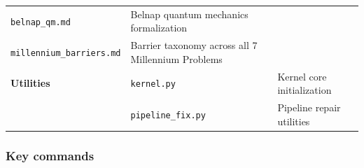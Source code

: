 \begin{longtable}[]{@{}lll@{}}
\begin{minipage}[t]{0.23\columnwidth}
\texttt{belnap\_qm.md}\strut
\end{minipage} & \begin{minipage}[t]{0.26\columnwidth}\raggedright
Belnap quantum mechanics formalization\strut
\end{minipage} & \begin{minipage}[t]{0.42\columnwidth}\raggedright
\strut
\end{minipage}\tabularnewline
\begin{minipage}[t]{0.23\columnwidth}\raggedright
\texttt{millennium\_barriers.md}\strut
\end{minipage} & \begin{minipage}[t]{0.26\columnwidth}\raggedright
Barrier taxonomy across all 7 Millennium Problems\strut
\end{minipage} & \begin{minipage}[t]{0.42\columnwidth}\raggedright
\strut
\end{minipage}\tabularnewline
\begin{minipage}[t]{0.23\columnwidth}\raggedright
\textbf{Utilities}\strut
\end{minipage} & \begin{minipage}[t]{0.26\columnwidth}\raggedright
\texttt{kernel.py}\strut
\end{minipage} & \begin{minipage}[t]{0.42\columnwidth}\raggedright
Kernel core initialization\strut
\end{minipage}\tabularnewline
\begin{minipage}[t]{0.23\columnwidth}\raggedright
\strut
\end{minipage} & \begin{minipage}[t]{0.26\columnwidth}\raggedright
\texttt{pipeline\_fix.py}\strut
\end{minipage} & \begin{minipage}[t]{0.42\columnwidth}\raggedright
Pipeline repair utilities\strut
\end{minipage}\tabularnewline
\bottomrule
\end{longtable}

\hypertarget{key-commands}{%
\subsubsection{Key commands}\label{key-commands}}

